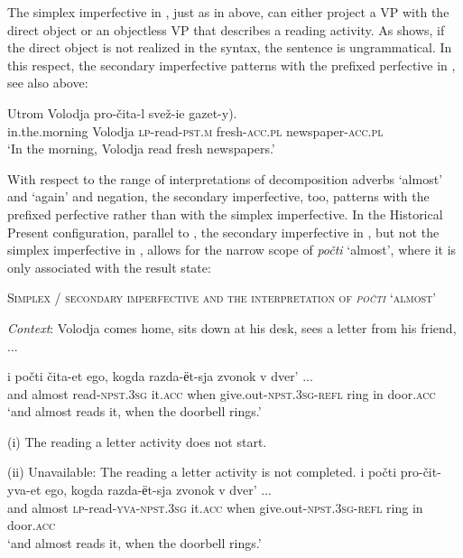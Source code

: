 \documentclass[output=paper,colorlinks,citecolor=brown]{langscibook}
\begin{document}
\noindent The simplex imperfective in , just as in  above, can either project a VP with the direct object or an objectless VP that describes a reading activity. As  shows, if the direct object is not realized in the syntax, the sentence is ungrammatical. In this respect, the secondary imperfective patterns with the prefixed perfective in , see also  above:

\ea\label{tat:ex:58}
\gll Utrom  Volodja  pro-čita-l  \minsp{*(} svež-ie   gazet-y).\\
  in.the.morning  Volodja  \textsc{lp}-read-\textsc{pst.m}  {} fresh-\textsc{acc.pl}   newspaper-\textsc{acc.pl}\\
\glt ‘In the morning, Volodja read fresh newspapers.’
\z

\noindent With respect to the range of interpretations of decomposition adverbs ‘almost’ and ‘again’ and negation, the secondary imperfective, too, patterns with the prefixed perfective rather than with the simplex imperfective. In the Historical Present configuration, parallel to , the secondary imperfective in , but not the simplex imperfective in , allows for the narrow scope of \textit{počti} ‘almost’, where it is only associated with the result state:

\eanoraggedright     \textsc{Simplex / secondary imperfective and the interpretation of \textit{počti} ‘almost’}\label{tat:ex:59}

\textit{Context}: Volodja comes home, sits down at his desk, sees a letter from his friend, ...

\ea
\gll i  počti  čita-et  ego,  kogda  razda-ёt-sja zvonok  v  dver' ...\\
    and  almost  read-\textsc{npst.3sg}  it.\textsc{acc}  when  give.out-\textsc{npst.3sg-refl} ring  in  door.\textsc{acc}\\
\glt ‘and almost reads it, when the doorbell rings.’

(i) The reading a letter activity does not start.

(ii) Unavailable: The reading a letter activity is not completed.\label{ex:tatevosov:59a}
\ex
\gll   i  počti  pro-čit-yva-et  ego,  kogda razda-{ёt-sja}  zvonok  v  dver' ...\\
    and  almost  \textsc{lp}-read-\textsc{yva-npst.3sg}  it.\textsc{acc}  when give.out-\textsc{npst.3sg-refl}  ring  in  door.\textsc{acc}\\
\glt ‘and almost reads it, when the doorbell rings.’
\end{document}
